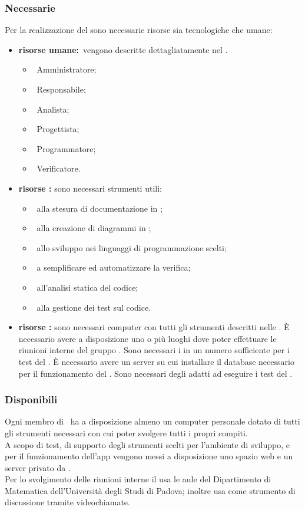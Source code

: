 		\subsubsection{Necessarie}
		\label{sec:3.6.1}
			Per la realizzazione del  sono necessarie risorse sia tecnologiche che umane:
			\begin{itemize}
				\item \textbf{risorse umane:}\ vengono descritte dettagliatamente nel \PPdoc.
				\begin{itemize}
					\item\ Amministratore;
					\item\ Responsabile;
					\item\ Analista;
					\item\ Progettista;
					\item\ Programmatore;
					\item\ Verificatore.
				\end{itemize}
				\item \textbf{risorse :} sono necessari strumenti  utili:
				\begin{itemize}
					\item\ alla stesura di documentazione in ;
					\item\ alla creazione di diagrammi in ;
					\item\ allo sviluppo nei linguaggi di programmazione scelti;
					\item\ a semplificare ed automatizzare la verifica;
					\item\ all'analisi statica del codice;
					\item\ alla gestione dei test sul codice.
				\end{itemize}
				\item \textbf{risorse :} sono necessari computer con tutti gli strumenti  descritti nelle \NPdoc. È necessario avere a disposizione uno o più luoghi dove poter effettuare le riunioni interne del gruppo \AUTORE. Sono necessari i  in un numero sufficiente per i test del . È necessario avere un server su cui installare il database necessario per il funzionamento del . Sono necessari degli  adatti ad eseguire i test del .
			\end{itemize}
		\subsubsection{Disponibili}
		\label{sec:3.6.2}
			Ogni membro di \AUTORE\ ha a disposizione almeno un computer personale dotato di tutti gli strumenti necessari con cui poter svolgere tutti i propri compiti. \\
			A scopo di test, di supporto degli strumenti scelti per l'ambiente di sviluppo, e per il funzionamento dell'app vengono messi a disposizione uno spazio web e un server privato da \PROPONENTE. \\
			Per lo svolgimento delle riunioni interne il  usa le aule del Dipartimento di Matematica dell'Università degli Studi di Padova; inoltre usa  come strumento di discussione tramite videochiamate.
